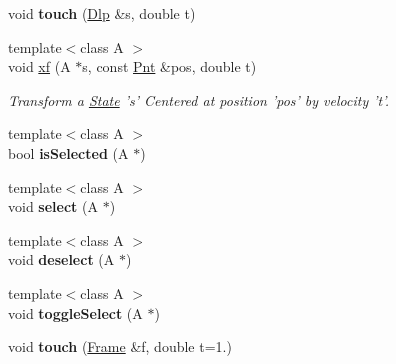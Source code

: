 \begin{DoxyCompactItemize}
\item 
\hypertarget{classvsr_1_1_interface_acb916ece3de0734ed606a5b3a1214ed9}{void {\bfseries touch} (\hyperlink{namespacevsr_ae6aa665e2777c681cdc7cab893be07d2}{Dlp} \&s, double t)}\label{classvsr_1_1_interface_acb916ece3de0734ed606a5b3a1214ed9}

\item 
\hypertarget{classvsr_1_1_interface_a8098ead4cfd2821fe7247e1a7520eb1b}{{\footnotesize template$<$class A $>$ }\\void \hyperlink{classvsr_1_1_interface_a8098ead4cfd2821fe7247e1a7520eb1b}{xf} (A $\ast$s, const \hyperlink{namespacevsr_a2d05beb9721c5d9211b479af6d47222d}{Pnt} \&pos, double t)}\label{classvsr_1_1_interface_a8098ead4cfd2821fe7247e1a7520eb1b}

\begin{DoxyCompactList}\small\item\em Transform a \hyperlink{structvsr_1_1_state}{State} 's' Centered at position 'pos' by velocity 't'. \end{DoxyCompactList}\item 
\hypertarget{classvsr_1_1_interface_a4549f7ecabbebbe4ce3785a125832b1d}{{\footnotesize template$<$class A $>$ }\\bool {\bfseries is\-Selected} (A $\ast$)}\label{classvsr_1_1_interface_a4549f7ecabbebbe4ce3785a125832b1d}

\item 
\hypertarget{classvsr_1_1_interface_abaab956b07b9850bba95714b3754fa1d}{{\footnotesize template$<$class A $>$ }\\void {\bfseries select} (A $\ast$)}\label{classvsr_1_1_interface_abaab956b07b9850bba95714b3754fa1d}

\item 
\hypertarget{classvsr_1_1_interface_a8bd5eafa0cea54a24bb690f7ed43b27a}{{\footnotesize template$<$class A $>$ }\\void {\bfseries deselect} (A $\ast$)}\label{classvsr_1_1_interface_a8bd5eafa0cea54a24bb690f7ed43b27a}

\item 
\hypertarget{classvsr_1_1_interface_a35d2d1a1770d414748a6c92c222b7518}{{\footnotesize template$<$class A $>$ }\\void {\bfseries toggle\-Select} (A $\ast$)}\label{classvsr_1_1_interface_a35d2d1a1770d414748a6c92c222b7518}

\item 
\hypertarget{classvsr_1_1_interface_ab635dea6dda3ce83e9fba29bc5d7e482}{void {\bfseries touch} (\hyperlink{classvsr_1_1_frame}{Frame} \&f, double t=1.)}\label{classvsr_1_1_interface_ab635dea6dda3ce83e9fba29bc5d7e482}


\end{DoxyCompactItemize}
